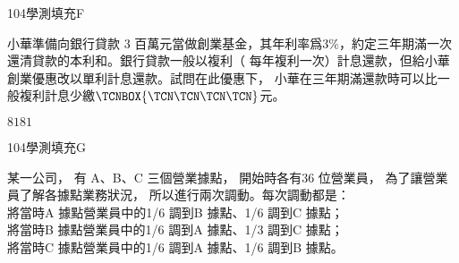 \begin{QUESTIONS}
\begin{QUESTION}
\begin{QSOLLIST}
        \end{QSOLLIST}
        \begin{QEMPTYSPACE}
        \end{QEMPTYSPACE}
    \end{QUESTION}
    \begin{QUESTION}
        \begin{ExamInfo}{104}{學測}{填充}{F}
        \end{ExamInfo}
        \begin{ExamAnsRateInfo}{26}{57}{18}{3}
        \end{ExamAnsRateInfo}
        \begin{QBODY}
            小華準備向銀行貸款 $3$ 百萬元當做創業基金，其年利率爲$3\%$，約定三年期滿一次還清貸款的本利和。銀行貸款一般以複利（ 每年複利一次）計息還款，但給小華創業優惠改以單利計息還款。試問在此優惠下， 小華在三年期滿還款時可以比一般複利計息少繳$\TCNBOX{\TCN\TCN\TCN\TCN }$元。
        \end{QBODY}
        \begin{QFROMS}
        \end{QFROMS}
        \begin{QTAGS}\end{QTAGS}
        \begin{QANS}
            $8181$
        \end{QANS}
        \begin{QSOLLIST}
        \end{QSOLLIST}
        \begin{QEMPTYSPACE}
        \end{QEMPTYSPACE}
    \end{QUESTION}
    \begin{QUESTION}
        \begin{ExamInfo}{104}{學測}{填充}{G}
        \end{ExamInfo}
        \begin{ExamAnsRateInfo}{46}{81}{47}{10}
        \end{ExamAnsRateInfo}
        \begin{QBODY}
            某一公司， 有 A、B、C 三個營業據點， 開始時各有36 位營業員， 為了讓營業員了解各據點業務狀況， 所以進行兩次調動。每次調動都是：\\
			將當時A 據點營業員中的1/6 調到B 據點、1/6 調到C 據點；\\
			將當時B 據點營業員中的1/6 調到A 據點、1/3 調到C 據點；\\
			將當時C 據點營業員中的1/6 調到A 據點、1/6 調到B 據點。\\

\end{QBODY}
\end{QUESTION}
\end{QUESTIONS}
